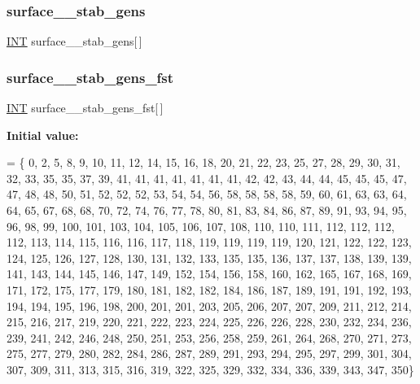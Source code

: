 \subsubsection{\texorpdfstring{surface\+\_\+\_\+stab\+\_\+gens}{surface\_53\_stab\_gens}}
{\footnotesize\ttfamily \mbox{\hyperlink{galois_8h_a09fddde158a3a20bd2dcadb609de11dc}{I\+NT}} surface\+\_\+\_\+stab\+\_\+gens\mbox{[}$\,$\mbox{]}}

\mbox{\label{surface__53_8_c_a3da1577c4837962d1be9c5a0a80bcff2}} 
\subsubsection{\texorpdfstring{surface\+\_\+\_\+stab\+\_\+gens\+\_\+fst}{surface\_53\_stab\_gens\_fst}}
{\footnotesize\ttfamily \mbox{\hyperlink{galois_8h_a09fddde158a3a20bd2dcadb609de11dc}{I\+NT}} surface\+\_\+\_\+stab\+\_\+gens\+\_\+fst\mbox{[}$\,$\mbox{]}}

{\bfseries Initial value\+:}
\begin{DoxyCode}
= \{ 0, 2, 5, 8, 9, 10, 11, 12, 14, 15, 
    16, 18, 20, 21, 22, 23, 25, 27, 28, 29, 
    30, 31, 32, 33, 35, 35, 37, 39, 41, 41, 
    41, 41, 41, 41, 41, 42, 42, 43, 44, 44, 
    45, 45, 45, 47, 47, 48, 48, 50, 51, 52, 
    52, 52, 53, 54, 54, 56, 58, 58, 58, 58, 
    59, 60, 61, 63, 63, 64, 64, 65, 67, 68, 
    68, 70, 72, 74, 76, 77, 78, 80, 81, 83, 
    84, 86, 87, 89, 91, 93, 94, 95, 96, 98, 
    99, 100, 101, 103, 104, 105, 106, 107, 108, 110, 
    110, 111, 112, 112, 112, 112, 113, 114, 115, 116, 
    116, 117, 118, 119, 119, 119, 119, 120, 121, 122, 
    122, 123, 124, 125, 126, 127, 128, 130, 131, 132, 
    133, 135, 135, 136, 137, 137, 138, 139, 139, 141, 
    143, 144, 145, 146, 147, 149, 152, 154, 156, 158, 
    160, 162, 165, 167, 168, 169, 171, 172, 175, 177, 
    179, 180, 181, 182, 182, 184, 186, 187, 189, 191, 
    191, 192, 193, 194, 194, 195, 196, 198, 200, 201, 
    201, 203, 205, 206, 207, 207, 209, 211, 212, 214, 
    215, 216, 217, 219, 220, 221, 222, 223, 224, 225, 
    226, 226, 228, 230, 232, 234, 236, 239, 241, 242, 
    246, 248, 250, 251, 253, 256, 258, 259, 261, 264, 
    268, 270, 271, 273, 275, 277, 279, 280, 282, 284, 
    286, 287, 289, 291, 293, 294, 295, 297, 299, 301, 
    304, 307, 309, 311, 313, 315, 316, 319, 322, 325, 
    329, 332, 334, 336, 339, 343, 347, 350\}
\end{DoxyCode}
\mbox{\label{surface__53_8_c_a57b8b4f58f0ad6589a4f7d47371c2884}} 
